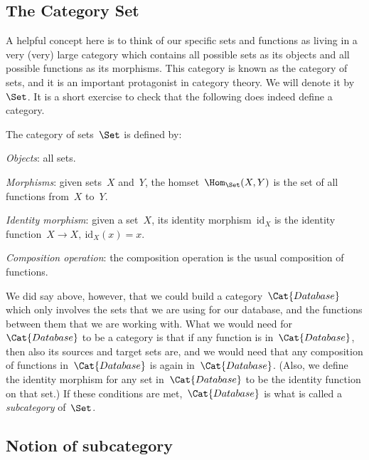 \subsection{The Category Set}

A helpful concept here is to think of our specific sets and functions as living in a very (very) large category which contains all possible sets as its objects and all possible functions as its morphisms. This category is known as the category of sets, and it is an important protagonist in category theory. We will denote it by $\Set$. It is a short exercise to check that the following does indeed define a category.

\begin{ctdefinition}
The category of sets~$\Set$ is defined by:
    \begin{compactenum}
    \item \emph{Objects}: all sets.
    \item \emph{Morphisms}: given sets~$X$ and~$Y$, the homset~$\Hom_\Set(X,Y)$ is the set of all functions from~$X$ to~$Y$.
    \item \emph{Identity morphism}: given a set~$X$, its identity morphism~$\text{id}_X$ is the identity function~$X \to X, \ \text{id}_X(x) = x$.
    \item \emph{Composition operation}: the composition operation is the usual composition of functions.
    \end{compactenum}
\end{ctdefinition} 



We did say above, however, that we could build a category~$\Cat{Database}$ which only involves the sets that we are using for our database, and the functions between them that we are working with. What we would need for~$\Cat{Database}$ to be a category is that if any function is in~$\Cat{Database}$, then also its sources and target sets are, and we would need that any composition of functions in~$\Cat{Database}$ is again in~$\Cat{Database}$. (Also, we define the identity morphism for any set in~$\Cat{Database}$ to be the identity function on that set.) If these conditions are met,~$\Cat{Database}$ is what is called a \emph{subcategory} of~$\Set$. 


\subsection{Notion of subcategory}
 
